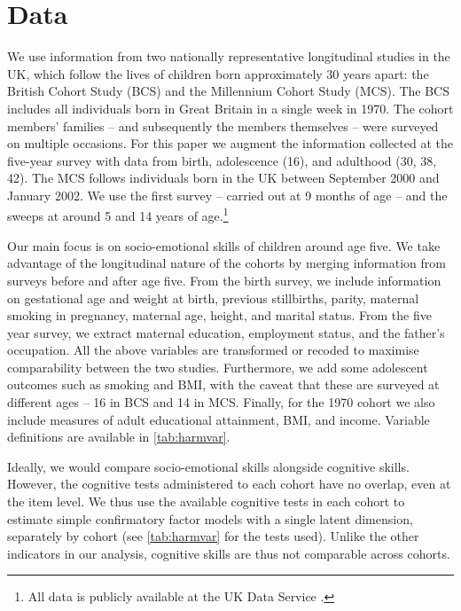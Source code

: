 
\section{Data \label{sec:data}}

We use information from two nationally representative longitudinal studies in the UK, which follow the lives of children born approximately 30 years apart: the British Cohort Study (BCS) and the Millennium Cohort Study (MCS). The BCS includes all individuals born in Great Britain in a single week in 1970. The cohort members' families -- and subsequently the members themselves -- were surveyed on multiple occasions. For this paper we augment the information collected at the five-year survey with data from birth, adolescence (16), and adulthood (30, 38, 42). The MCS follows individuals born in the UK between September 2000 and January 2002. We use the first survey -- carried out at 9 months of age -- and the sweeps at around 5 and 14 years of age.\footnote{All data is publicly available at the UK Data Service \citep{Chamberlain2013,Butler2016a,Butler2016b,Butler2017,UniversityOfLondon.InstituteOfEducation.CentreForLongitudinalStudies2016b,UniversityOfLondon.InstituteOfEducation.CentreForLongitudinalStudies2016,UniversityOfLondon.InstituteOfEducation.CentreForLongitudinalStudies2016a,UniversityOfLondon.InstituteOfEducation.CentreForLongitudinalStudies2017b,UniversityOfLondon.InstituteOfEducation.CentreForLongitudinalStudies2017,UniversityOfLondon.InstituteOfEducation.CentreForLongitudinalStudies2017c}.}

Our main focus is on socio-emotional skills of children around age five. We take advantage of the longitudinal nature of the cohorts by merging information from surveys before and after age five. From the birth survey, we include information on gestational age and weight at birth, previous stillbirths, parity, maternal smoking in pregnancy, maternal age, height, and marital status. From the five year survey, we extract maternal education, employment status, and the father's occupation. All the above variables are transformed or recoded to maximise comparability between the two studies. Furthermore, we add some adolescent outcomes such as smoking and BMI, with the caveat that these are surveyed at different ages -- 16 in BCS and 14 in MCS. Finally, for the 1970 cohort we also include measures of adult educational attainment, BMI, and income. Variable definitions are available in \autoref{tab:harmvar}.

Ideally, we would compare socio-emotional skills alongside cognitive skills. However, the cognitive tests administered to each cohort have no overlap, even at the item level. We thus use the available cognitive tests in each cohort to estimate simple confirmatory factor models with a single latent dimension, separately by cohort (see \autoref{tab:harmvar} for the tests used). Unlike the other indicators in our analysis, cognitive skills are thus not comparable across cohorts. 


